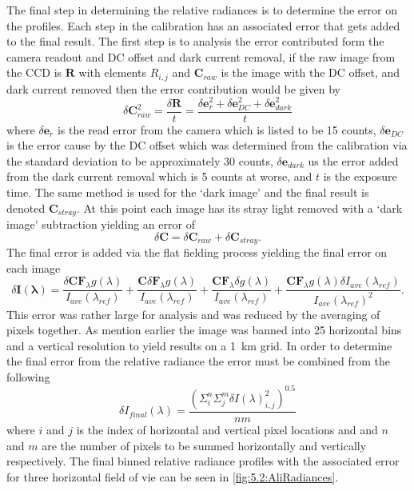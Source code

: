 The final step in determining the relative radiances is to determine the error on the profiles. Each step in the calibration has an associated error that gets added to the final result. The first step is to analysis the error contributed form the camera readout and DC offset and dark current removal, if the raw image from the CCD is $\mathbf{R}$ with elements $R_{i,j}$ and $\mathbf{C}_{raw}$ is the image with the DC offset, and dark current removed then the error contribution would be given by
\begin{equation}
    \delta\mathbf{C}_{raw}^2 = \frac{\delta\mathbf{R}}{t} = \frac{\delta\mathbf{e}_{r}^{2} + \delta\mathbf{e}_{DC}^{2} + \delta\mathbf{e}_{dark}^{2}}{t}
\end{equation}
where $\delta \mathbf{e}_{r}$ is the read error from the camera which is listed to be 15 counts, $\delta \mathbf{e}_{DC}$ is the error cause by the DC offset which was determined from the calibration via the standard deviation to be approximately 30 counts, $\delta \mathbf{e}_{dark}$ us the error added from the dark current removal which is 5 counts at worse, and $t$ is the exposure time. The same method is used for the `dark image' and the final result is denoted $\mathbf{C}_{stray}$. At this point each image has its stray light removed with a `dark image' subtraction yielding an error of
\begin{equation}
  \delta\mathbf{C} = \delta\mathbf{C}_{raw} + \delta\mathbf{C}_{stray}.
\end{equation} 
The final error is added via the flat fielding process yielding the final error on each image
\begin{equation}
    \delta\mathbf{I(\lambda)} = \frac{\delta\mathbf{C}\mathbf{F}_{\lambda}g(\lambda)}{I_{ave}(\lambda_{ref})} + \frac{\mathbf{C}\delta\mathbf{F}_{\lambda}g(\lambda)}{I_{ave}(\lambda_{ref})} + \frac{\mathbf{C}\mathbf{F}_{\lambda}\delta g(\lambda)}{I_{ave}(\lambda_{ref})} + \frac{\mathbf{C}\mathbf{F}_{\lambda}g(\lambda)\delta I_{ave}(\lambda_{ref})}{I_{ave}(\lambda_{ref})^{2}}.
\end{equation}
This error was rather large for analysis and was reduced by the averaging of pixels together. As mention earlier the image was banned into 25 horizontal bins and a vertical resolution to yield results on a 1~km grid. In order to determine the final error from the relative radiance the error must be combined from the following
\begin{equation}
    \delta I_{final}(\lambda) = \frac{(\Sigma^{n}_{i}\Sigma^{m}_{j}\delta I(\lambda)_{i,j}^{2})^0.5}{nm}
\end{equation}
where $i$ and $j$ is the index of horizontal and vertical pixel locations and and $n$ and $m$ are the number of pixels to be summed horizontally and vertically respectively. The final binned relative radiance profiles with the associated error for three horizontal field of vie can be seen in \autoref{fig:5.2:AliRadiances}.

